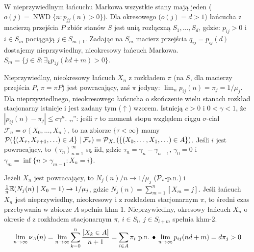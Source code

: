 W  nieprzywiedlnym łańcuchu Markowa wszystkie stany mają jeden  ($o(j) = \operatorname{NWD}\{n : p_{jj}(n) > 0\}$).
Dla okresowego ($o(j) = d > 1$) łańcucha z macierzą przejścia $P$ zbiór stanów $S$ jest unią rozłączną $S_1, \ldots, S_d$, gdzie: $p_{ij} > 0$ i $i \in S_m$ pociągają $j \in S_{m+1}$.
Zadając na $S_m$ macierz przejścia $q_{ij} = p_{ij}(d)$ dostajemy nieprzywiedlny, nieokresowy łańcuch Markowa.
\hfill $S_m = \{j \in S : \exists_k p_{1j}(kd+m)>0\}$.

Nieprzywiedlny,  nieokresowy łańcuch $X_n$ z rozkładem  $\pi$ (na $S$, dla macierzy przejścia $P$, $\pi = \pi P$) jest powracający, zaś $\pi$ jedyny: $\lim_{n} p_{ij}(n) = \pi_j = 1/\mu_j$. 
Dla nieprzywiedlnego, nieokresowego łańcucha o skończenie wielu stanach rozkład stacjonarny istnieje i jest zadany tym ($\uparrow$) wzorem.
Istnieją $c > 0$ i $0 < \gamma < 1$, że $|p_{ij}(n) - \pi_j| \le c \gamma^n$.
,,'': jeśli $\tau$ to moment stopu względem ciągu $\sigma$-ciał $\mathcal F_n = \sigma (X_0, \ldots, X_n)$, to na zbiorze $\{\tau < \infty\}$ mamy $\operatorname{\mathcal{P}}(\{(X_\tau, X_{\tau + 1}, \ldots) \in A \} \mid \mathcal F_\tau ) = \operatorname{\mathcal{P}}_{X_\tau} (\{(X_0, \ldots, X_1, \ldots) \in A\})$.
Jeśli $i$ jest powracający, to $(\tau_n)_{n=1}^\infty$ są iid, gdzie $\tau_n = \gamma_n - \gamma_{n-1}$, $\gamma_0 = 0$ i $\gamma_m = \inf \{n > \gamma_{m-1} : X_n = i\}$.

Jeżeli $X_n$ jest powracający, to $N_j(n)/n \to 1/\mu_j$ ($\operatorname{\mathcal{P}}_i$-p.n.) i $\frac{1}{n} \mathbb{E} (N_j(n) \mid X_0 = 1) \to 1/\mu_j$, gdzie $N_j(n) = \sum_{m=1}^n [X_m = j]$.
Jeśli łańcuch $X_n$ jest nieprzywiedlny, nieokresowy i z rozkładem stacjonarnym $\pi$, to średni czas przebywania w zbiorze $A$ spełnia khm-1.
Nieprzywiedlny, okresowy łańcuch $X_n$ o okresie $d$ z rozkładem stacjonarnym $\pi$, $i \in S_l$, $j \in S_{l+m}$ spełnia khm-2.
\[
	\lim_{n \to \infty} \nu_A(n) = \lim_{n \to \infty} \sum_{k=0}^n \frac{[X_k \in A]}{n+1} = \sum_{i \in A} \pi_i \textrm{ p.n.} \, \bullet \,
	\lim_{n \to \infty} p_{ij} (nd+m) = d \pi_j > 0
\]